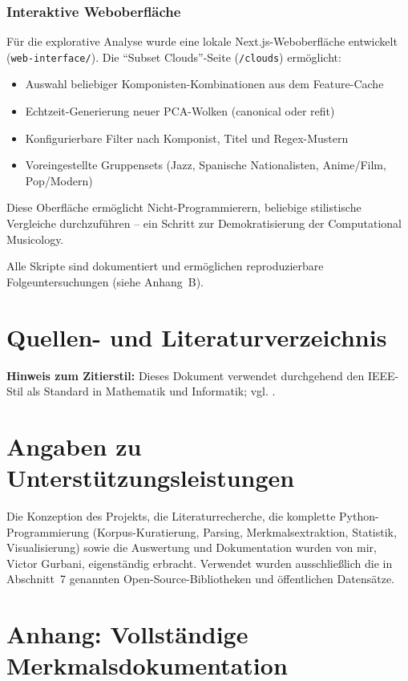 \documentclass[12pt,a4paper]{article}
\theoremstyle{definition}
\begin{document}
\subsubsection{Interaktive Weboberfläche}
Für die explorative Analyse wurde eine lokale Next.js-Weboberfläche entwickelt (\texttt{web-interface/}). Die \enquote{Subset Clouds}-Seite (\texttt{/clouds}) ermöglicht:
\begin{itemize}
    \item Auswahl beliebiger Komponisten-Kombinationen aus dem Feature-Cache
    \item Echtzeit-Generierung neuer PCA-Wolken (canonical oder refit)
    \item Konfigurierbare Filter nach Komponist, Titel und Regex-Mustern
    \item Voreingestellte Gruppensets (Jazz, Spanische Nationalisten, Anime/Film, Pop/Modern)
\end{itemize}
Diese Oberfläche ermöglicht Nicht-Programmierern, beliebige stilistische Vergleiche durchzuführen -- ein Schritt zur Demokratisierung der Computational Musicology.

Alle Skripte sind dokumentiert und ermöglichen reproduzierbare Folgeuntersuchungen (siehe Anhang~B).

\clearpage
\hypersetup{pageanchor=false}
\section{Quellen- und Literaturverzeichnis}
\textbf{Hinweis zum Zitierstil:} Dieses Dokument verwendet durchgehend den IEEE-Stil als Standard in Mathematik und Informatik; vgl. \cite{IEEEStyle}.
\printbibliography[heading=none]

\section*{Angaben zu Unterstützungsleistungen}
Die Konzeption des Projekts, die Literaturrecherche, die komplette Python-Programmierung (Korpus-Kuratierung, Parsing, Merkmalsextraktion, Statistik, Visualisierung) sowie die Auswertung und Dokumentation wurden von mir, Victor Gurbani, eigenständig erbracht. Verwendet wurden ausschließlich die in Abschnitt~7 genannten Open-Source-Bibliotheken und öffentlichen Datensätze. 

\newpage
{}
\hypersetup{pageanchor=true}
\setcounter{page}{1}
\appendix
\section{Anhang: Vollständige Merkmalsdokumentation}
\end{document}
